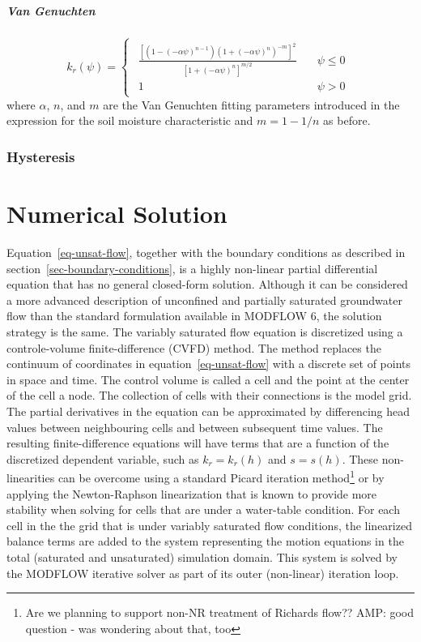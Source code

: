 \documentclass[fleqn]{article}
\begin{document}
\subparagraph{Van Genuchten}
\begin{equation}
  k_r(\psi)  =
  \begin{cases}
    \begin{aligned}
      \frac{
        \left[
          \left( 1 - (-\alpha \psi)^{n-1} \right) 
          \left( 1 + (-\alpha \psi)^n \right)^{-m}
          \right]^2
      }
      {
        \left[ 1 + (-\alpha \psi)^n \right]^{m/2}
      }
      
      \quad   & \psi \leq 0 \\
      1 \quad & \psi > 0
    \end{aligned}
  \end{cases}
  \label{eq-kr-vanGenuchten}
\end{equation}
where $\alpha$, $n$, and $m$ are the Van Genuchten fitting parameters
introduced in the expression for the soil moisture characteristic
and $m = 1 - 1/n$ as before.
\subsubsection{Hysteresis}

\section{Numerical Solution}
Equation~\ref{eq-unsat-flow}, together with the boundary conditions as
described in section~\ref{sec-boundary-conditions}, is a highly non-linear
partial differential equation that has no general closed-form solution.
Although it can be considered a more advanced description of unconfined
and partially saturated groundwater flow than the standard formulation
available in MODFLOW 6, the solution strategy is the same. The variably
saturated flow equation is discretized using a controle-volume
finite-difference (CVFD) method. The method replaces the continuum of
coordinates in equation~\ref{eq-unsat-flow} with a discrete set of 
points in space and time. The control volume is called a cell and the
point at the center of the cell a node. The collection of cells with
their connections is the model grid. The partial derivatives in the
equation can be approximated by differencing head values between 
neighbouring cells and between subsequent time values. The resulting
finite-difference equations will have terms that are a function
of the discretized dependent variable, such as $k_r = k_r(h)$ and 
$s = s(h)$. These non-linearities can be overcome using a standard
Picard iteration method\footnote{Are we planning to support non-NR
  treatment of Richards flow?? AMP: good question - was wondering about that, too} or by applying the Newton-Raphson 
linearization that is known to provide more stability when solving for
cells that are under a water-table condition. For each cell in the
the grid that is under variably saturated flow conditions, the
linearized balance terms are added to the system representing the
motion equations in the total (saturated and unsaturated) simulation 
domain. This system is solved by the MODFLOW iterative solver as part
of its outer (non-linear) iteration loop.
\end{document}
